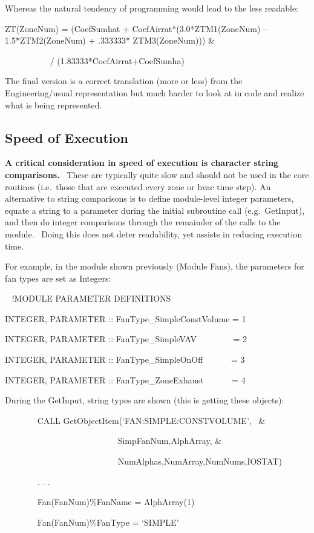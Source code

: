 Whereas the natural tendency of programming would lead to the less readable:

ZT(ZoneNum) = (CoefSumhat + CoefAirrat*(3.0*ZTM1(ZoneNum) -- 1.5*ZTM2(ZoneNum) + .333333* ZTM3(ZoneNum))) \&

~~~~~~~~~~ / (1.83333*CoefAirrat+CoefSumha)

The final version is a correct translation (more or less) from the Engineering/usual representation but much harder to look at in code and realize what is being represented.

\subsection{Speed of Execution}\label{speed-of-execution}

\textbf{A critical consideration in speed of execution is character string comparisons.}~ These are typically quite slow and should not be used in the core routines (i.e.~those that are executed every zone or hvac time step). An alternative to string comparisons is to define module-level integer parameters, equate a string to a parameter during the initial subroutine call (e.g.~GetInput), and then do integer comparisons through the remainder of the calls to the module.~ Doing this does not deter readability, yet assists in reducing execution time.

For example, in the module shown previously (Module Fans), the parameters for fan types are set as Integers:

~ !MODULE PARAMETER DEFINITIONS

INTEGER, PARAMETER :: FanType\_SimpleConstVolume = 1

INTEGER, PARAMETER :: FanType\_SimpleVAV~~~~~~~~ = 2

INTEGER, PARAMETER :: FanType\_SimpleOnOff~~~~~~ = 3

INTEGER, PARAMETER :: FanType\_ZoneExhaust~~~~~~ = 4

During the GetInput, string types are shown (this is getting these objects):

~~~~~~~ CALL GetObjectItem(`FAN:SIMPLE:CONSTVOLUME',~ \&

~~~~~~~~~~~~~~~~~~~~~~~~~~ SimpFanNum,AlphArray, \&

~~~~~~~~~~~~~~~~~~~~~~~~ ~~NumAlphas,NumArray,NumNums,IOSTAT)

~~~~~~~ . . .

~~~~~~~ Fan(FanNum)\%FanName = AlphArray(1)

~~~~~~~ Fan(FanNum)\%FanType = `SIMPLE'

